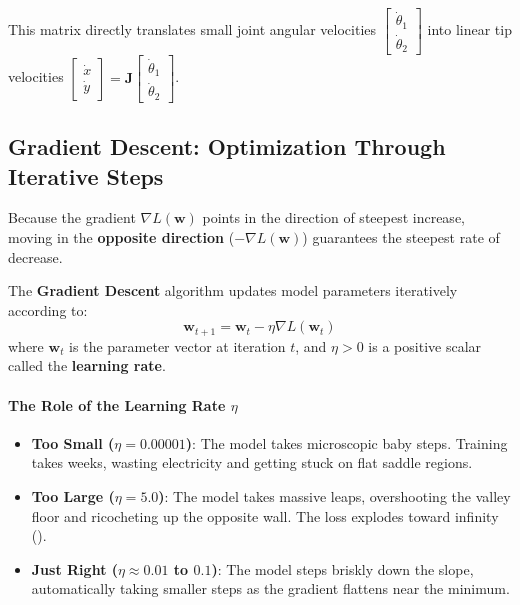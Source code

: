 This matrix directly translates small joint angular velocities $\begin{bmatrix} \dot{\theta}_1 \\ \dot{\theta}_2 \end{bmatrix}$ into linear tip velocities $\begin{bmatrix} \dot{x} \\ \dot{y} \end{bmatrix} = \mathbf{J} \begin{bmatrix} \dot{\theta}_1 \\ \dot{\theta}_2 \end{bmatrix}$.

\subsection{Gradient Descent: Optimization Through Iterative Steps}

\begin{keyidea}
Because the gradient $\nabla L(\mathbf{w})$ points in the direction of steepest increase, moving in the \textbf{opposite direction} ($-\nabla L(\mathbf{w})$) guarantees the steepest rate of decrease. 

The \textbf{Gradient Descent} algorithm updates model parameters iteratively according to:
\begin{equation}
\mathbf{w}_{t+1} = \mathbf{w}_t - \eta \nabla L(\mathbf{w}_t)\label{eq:gradient_descent}
\end{equation}
where $\mathbf{w}_t$ is the parameter vector at iteration $t$, and $\eta > 0$ is a positive scalar called the \textbf{learning rate}.
\end{keyidea}

\paragraph{The Role of the Learning Rate $\eta$}
\begin{itemize}
    \item \textbf{Too Small ($\eta = 0.00001$)}: The model takes microscopic baby steps. Training takes weeks, wasting electricity and getting stuck on flat saddle regions.
    \item \textbf{Too Large ($\eta = 5.0$)}: The model takes massive leaps, overshooting the valley floor and ricocheting up the opposite wall. The loss explodes toward infinity ().
    \item \textbf{Just Right ($\eta \approx 0.01$ to $0.1$)}: The model steps briskly down the slope, automatically taking smaller steps as the gradient flattens near the minimum.
\end{itemize}

